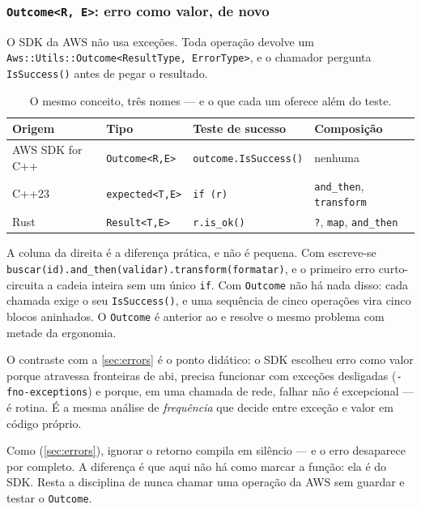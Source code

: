 \subsubsection{\texttt{Outcome<R, E>}: erro como valor, de novo}

O SDK da AWS não usa exceções. Toda operação devolve um
\texttt{Aws::Utils::Outcome<ResultType, ErrorType>}, e o chamador pergunta
\texttt{IsSuccess()} antes de pegar o resultado.

\begin{table}[htbp]
\centering
\caption{O mesmo conceito, três nomes --- e o que cada um oferece além do teste.}
\label{tab:outcome}
\footnotesize
\begin{tabular}{@{}llll@{}}
\toprule
\textbf{Origem} & \textbf{Tipo} & \textbf{Teste de sucesso} & \textbf{Composição} \\
\midrule
AWS SDK for C++ & \texttt{Outcome<R,E>}   & \texttt{outcome.IsSuccess()} & nenhuma \\
C++23           & \texttt{expected<T,E>}  & \texttt{if (r)}              & \texttt{and\_then}, \texttt{transform} \\
Rust            & \texttt{Result<T,E>}    & \texttt{r.is\_ok()}          & \texttt{?}, \texttt{map}, \texttt{and\_then} \\
\bottomrule
\end{tabular}
\end{table}

A coluna da direita é a diferença prática, e não é pequena. Com
 escreve-se
\texttt{buscar(id).and\_then(validar).transform(formatar)}, e o primeiro erro
curto-circuita a cadeia inteira sem um único \texttt{if}. Com
\texttt{Outcome} não há nada disso: cada chamada exige o seu
\texttt{IsSuccess()}, e uma sequência de cinco operações vira cinco blocos
aninhados. O \texttt{Outcome} é anterior ao  e resolve o
mesmo problema com metade da ergonomia.

O contraste com a \cref{sec:errors} é o ponto didático: o SDK escolheu erro como
valor porque atravessa fronteiras de \gls{abi}, precisa funcionar com exceções
desligadas (\texttt{-fno-exceptions}) e porque, em uma chamada de rede, falhar
não é excepcional --- é rotina. É a mesma análise de \emph{frequência} que
decide entre exceção e valor em código próprio.

\begin{armadilha}
Como  (\cref{sec:errors}), ignorar o retorno compila em
silêncio --- e o erro desaparece por completo. A diferença é que aqui não há
como marcar a função: ela é do SDK. Resta a disciplina de nunca chamar uma
operação da AWS sem guardar e testar o \texttt{Outcome}.
\end{armadilha}

